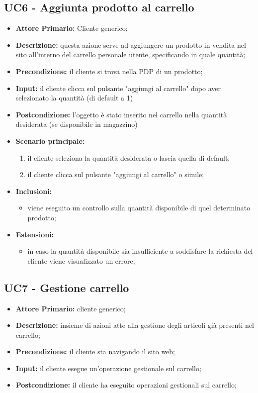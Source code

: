 \subsection{UC6 - Aggiunta prodotto al carrello}
\label{UC6}
\begin{itemize}
    \item \textbf{Attore Primario:} Cliente generico;
    \item \textbf{Descrizione:} questa azione serve ad aggiungere un prodotto in vendita nel sito
                                all'interno del carrello personale utente, specificando in quale quantità;
    \item \textbf{Precondizione:} il cliente si trova nella PDP di un prodotto;
    \item \textbf{Input:} il cliente clicca sul pulsante "aggiungi al carrello" dopo aver selezionato la quantità (di default a 1)
    \item \textbf{Postcondizione:} l'oggetto è stato inserito nel carrello nella quantità desiderata (se disponibile in magazzino)
    \item \textbf{Scenario principale:}
    \begin{enumerate}
        \item il cliente seleziona la quantità desiderata o lascia quella di default;
        \item il cliente clicca sul pulsante "aggiungi al carrello" o simile;
    \end{enumerate}
    \item \textbf{Inclusioni:}
    \begin{itemize}
        \item viene eseguito un controllo sulla quantità disponibile di quel determinato prodotto;
    \end{itemize}
    \item \textbf{Estensioni:}
    \begin{itemize}
        \item in caso la quantità disponibile sia insufficiente a soddisfare la richiesta del cliente viene visualizzato un errore;
    \end{itemize}
\end{itemize}

\subsection{UC7 - Gestione carrello}
\label{UC7}
\begin{itemize}
    \item \textbf{Attore Primario:} cliente generico;
    \item \textbf{Descrizione:} insieme di azioni atte alla gestione degli articoli già presenti nel carrello;
    \item \textbf{Precondizione:} il cliente sta navigando il sito web;
    \item \textbf{Input:} il cliente esegue un'operazione gestionale sul carrello;
    \item \textbf{Postcondizione:} il cliente ha eseguito operazioni gestionali sul carrello;
\end{itemize}

